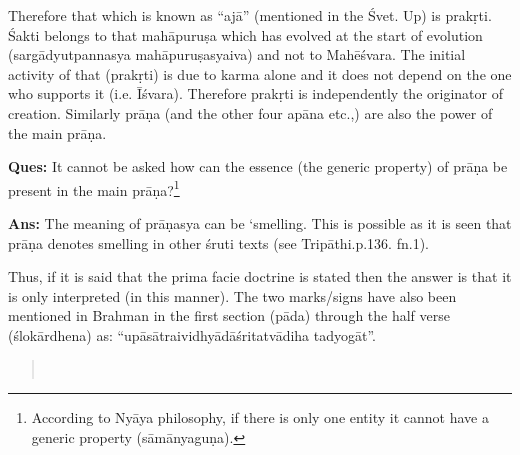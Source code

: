 Therefore that which is known as “ajā” (mentioned in the Śvet. Up) is prakṛti. Śakti belongs to that mahāpuruṣa which has evolved at the start of evolution (sargādyutpannasya mahāpuruṣasyaiva) and not to Mahēśvara. The initial activity of that (prakṛti) is due to karma alone and it does not depend on the one who supports it (i.e. Īśvara). Therefore prakṛti is independently the originator of creation. Similarly prāṇa (and the other four apāna etc.,) are also the power of the main prāṇa.

\textbf{Ques:} It cannot be asked how can the essence (the generic property) of prāṇa be present in the main prāṇa?\footnote{According to Nyāya philosophy, if there is only one entity it cannot have a generic property (sāmānyaguṇa).}

\textbf{Ans:} The meaning of prāṇasya can be ‘smelling. This is possible as it is seen that prāṇa denotes smelling in other śruti texts (see Tripāthi.p.136. fn.1).

Thus, if it is said that the prima facie doctrine is stated then the answer is that it is only interpreted (in this manner). The two marks/signs have also been mentioned in Brahman in the first section (pāda) through the half verse (ślokārdhena) as: “upāsātraividhyādāśritatvādiha tadyogāt”.


\begin{verse}
\\
\end{verse}


